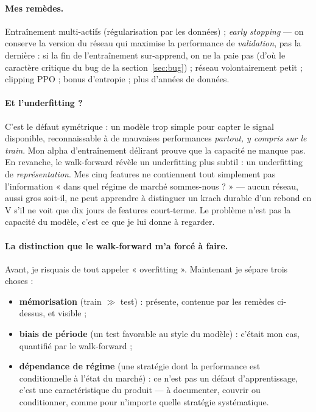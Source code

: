 \documentclass[11pt,a4paper]{article}
\begin{document}
\paragraph{Mes remèdes.} Entraînement multi-actifs (régularisation par les données) ;
\emph{early stopping} --- on conserve la version du réseau qui maximise la performance
de \emph{validation}, pas la dernière : si la fin de l'entraînement sur-apprend, on ne
la paie pas (d'où le caractère critique du bug de la section~\ref{sec:bug}) ; réseau
volontairement petit ; clipping PPO ; bonus d'entropie ; plus d'années de données.

\paragraph{Et l'underfitting ?} C'est le défaut symétrique : un modèle trop simple pour
capter le signal disponible, reconnaissable à de mauvaises performances \emph{partout,
y compris sur le train}. Mon alpha d'entraînement délirant prouve que la capacité ne
manque pas. En revanche, le walk-forward révèle un underfitting plus subtil : un
underfitting de \emph{représentation}. Mes cinq features ne contiennent tout simplement
pas l'information « dans quel régime de marché sommes-nous ? » --- aucun réseau, aussi
gros soit-il, ne peut apprendre à distinguer un krach durable d'un rebond en V s'il ne
voit que dix jours de features court-terme. Le problème n'est pas la capacité du
modèle, c'est ce que je lui donne à regarder.

\paragraph{La distinction que le walk-forward m'a forcé à faire.} Avant, je risquais de
tout appeler « overfitting ». Maintenant je sépare trois choses :
\begin{itemize}[itemsep=2pt]
  \item \textbf{mémorisation} (train $\gg$ test) : présente, contenue par les remèdes
        ci-dessus, et visible ;
  \item \textbf{biais de période} (un test favorable au style du modèle) : c'était mon
        cas, quantifié par le walk-forward ;
  \item \textbf{dépendance de régime} (une stratégie dont la performance est
        conditionnelle à l'état du marché) : ce n'est pas un défaut d'apprentissage,
        c'est une caractéristique du produit --- à documenter, couvrir ou conditionner,
        comme pour n'importe quelle stratégie systématique.
\end{itemize}
\end{document}
